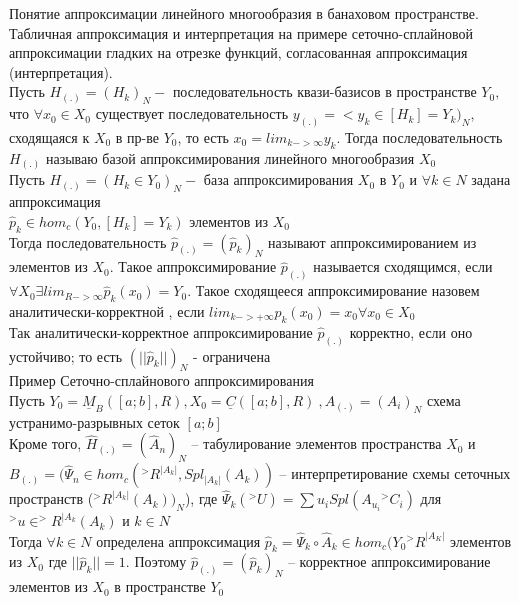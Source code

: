 \documentclass[__main__.tex]{subfiles}
\begin{document}
Понятие аппроксимации линейного многообразия в банаховом пространстве. Табличная аппроксимация и интерпретация на примере сеточно-сплайновой аппроксимации гладких на отрезке функций, согласованная аппроксимация (интерпретация).\\

Пусть $H_{(.)} = (H_k)_N - $ последовательность квази-базисов в пространстве $Y_0,$ что $\forall x_0\in X_0$ существует последовательность $y_{(.)}=<y_k\in [H_k]=Y_k)_N,$ сходящаяся к $X_0$ в пр-ве $Y_0$, то есть $x_0=lim_{k->\infty}y_k.$ Тогда последовательность $H_{(.)}$ называю базой аппроксимирования линейного многообразия $X_0$ \\

Пусть $H_{(.)}=(H_k \in Y_0)_N - $ база аппроксимирования $X_0$ в $Y_0$  и $\forall k \in N$ задана аппроксимация\\
$\hat{p}_k \in hom_c (Y_0,[H_k]=Y_k)$ элементов из $X_0$\\
Тогда последовательность $\hat{p}_{(.)}=(\hat{p}_k)_N $ называют аппроксимированием из элементов из $X_0$. Такое аппроксимирование  $\hat{p}_{(.)}$ называется сходящимся, если $\forall X_0 \exists lim_{R->\infty} \hat{p}_k (x_0) = Y_0$. Такое сходящееся аппроксимирование назовем аналитически-корректной , если $lim_{k->+\infty}\hat{p}_k(x_0)=x_0 \forall x_0\in X_0$\\
Так аналитически-корректное аппроксимирование $\hat{p}_{(.)}$ корректно, если оно устойчиво; то есть $(||\hat{p}_k||)_N$ - ограничена\\

Пример Сеточно-сплайнового аппроксимирования \\
Пусть $Y_0=\underline{M}_B([a;b],R),X_0=\underline{C}([a;b],R) \ ,A_{(.)}=(A_i)_N$ схема устранимо-разрывных сеток $[a;b]$\\
Кроме того, $\hat{H}_{(.)}=(\hat{A}_n)_N$ -- табулирование элементов пространства $X_0$ и $B_{(.)}=(\hat{\Psi}_n\in hom_c(^>R^{|A_k|},Spl_{|A_k|}(A_k))$ -- интерпретирование схемы сеточных пространств ($^>R^{|A_k|}(A_k))_N$), где $\hat{\Psi}_k(^>U)=\sum u_i Spl(A_{u_i}{^>C}_i)	$ для $^>u\in ^>R^{|A_k}(A_k)$  и  $k\in N$\\
Тогда $\forall k\in N$ определена аппроксимация $\hat{p}_k=\hat{\Psi}_k \circ \hat{A}_k \in hom_c(Y_0{^>R}^{|A_K|}$ элементов из $X_0$	где $||\hat{p}_k||=1$. Поэтому $\hat{p}_{(.)}=(\hat{p}_k)_N$ -- корректное аппроксимирование элементов из $X_0$  в пространстве $Y_0$\\
\end{document}
